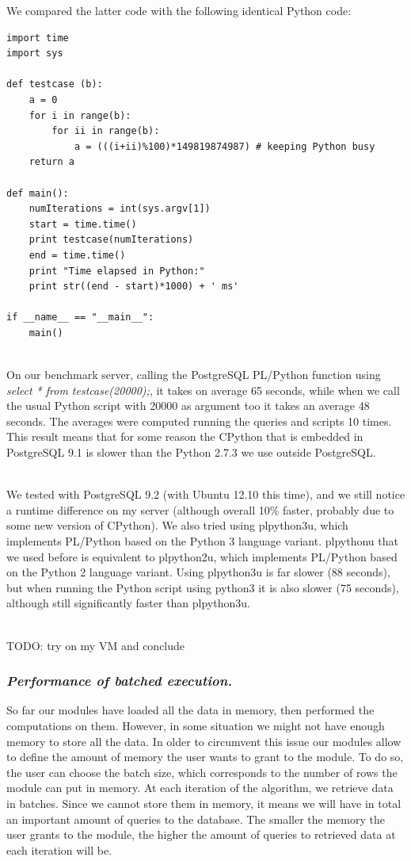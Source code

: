 We compared the latter code with the following identical Python code:
\begin{verbatim}
import time
import sys

def testcase (b):     
    a = 0
    for i in range(b):
        for ii in range(b):
            a = (((i+ii)%100)*149819874987) # keeping Python busy
    return a

def main():    
    numIterations = int(sys.argv[1])        
    start = time.time()
    print testcase(numIterations)
    end = time.time()
    print "Time elapsed in Python:"
    print str((end - start)*1000) + ' ms'        

if __name__ == "__main__":
    main()
\end{verbatim}

~~\\
On our benchmark server, calling the PostgreSQL PL/Python function using \textit{select * from testcase(20000);}, it takes on average 65 seconds, while when we call the usual Python script with 20000 as argument too it takes an average 48 seconds. The averages were computed running the queries and scripts 10 times. This result means that for some reason the CPython that is embedded in PostgreSQL 9.1 is slower than the Python 2.7.3 we use outside PostgreSQL.

~~\\
We tested with PostgreSQL 9.2 (with Ubuntu 12.10 this time), and we still notice a runtime difference on my server (although overall 10\% faster, probably due to some new version of CPython). We also tried using plpython3u, which implements PL/Python based on the Python 3 language variant. plpythonu that we used before is equivalent to plpython2u, which implements PL/Python based on the Python 2 language variant. Using plpython3u is far slower (88 seconds), but when running the Python script using python3 it is also slower (75 seconds), although still significantly faster than plpython3u.

~~\\
TODO: try on my VM and conclude


\subsubsection*{\itshape Performance of batched execution.}

So far our modules have loaded all the data in memory, then performed the computations on them. However, in some situation we might not have enough memory to store all the data. In older to circumvent this issue our modules allow to define the amount of memory the user wants to grant to the module. To do so, the user can choose the batch size, which corresponds to the number of rows the module can put in memory. At each iteration of the algorithm, we retrieve data in batches. Since we cannot store them in memory, it means we will have in total an important amount of queries to the database. The smaller the memory the user grants to the module, the higher the amount of queries to retrieved data at each iteration will be.

